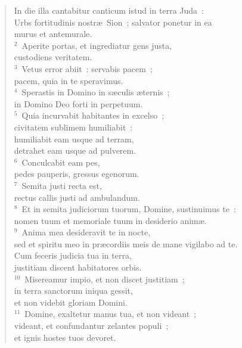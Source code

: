 \begin{flushleft}\begin{verse}\vspace{-19pt}\hspace{6pt}In die illa cantabitur canticum istud in terra Juda~:\\\hspace{6pt} Urbs fortitudinis nostr\ae\ Sion~; salvator ponetur in ea\\ murus et antemurale.\\
${}^{2}$~Aperite portas, et ingrediatur gens justa,\\ custodiens veritatem.\\
${}^{3}$~Vetus error abiit~: servabis pacem~;\\ pacem, quia in te speravimus.\\
${}^{4}$~Sperastis in Domino in s\ae culis \ae ternis~;\\ in Domino Deo forti in perpetuum.\\
${}^{5}$~Quia incurvabit habitantes in excelso~;\\ civitatem sublimem humiliabit~:\\ humiliabit eam usque ad terram,\\ detrahet eam usque ad pulverem.\\
${}^{6}$~Conculcabit eam pes,\\ pedes pauperis, gressus egenorum.\\
${}^{7}$~Semita justi recta est,\\ rectus callis justi ad ambulandum.\\
${}^{8}$~Et in semita judiciorum tuorum, Domine, sustinuimus te~:\\ nomen tuum et memoriale tuum in desiderio anim\ae .\\
${}^{9}$~Anima mea desideravit te in nocte,\\ sed et spiritu meo in pr\ae cordiis meis de mane vigilabo ad te.\\ Cum feceris judicia tua in terra,\\ justitiam discent habitatores orbis.\\
${}^{10}$~Misereamur impio, et non discet justitiam~;\\ in terra sanctorum iniqua gessit,\\ et non videbit gloriam Domini.\\
${}^{11}$~Domine, exaltetur manus tua, et non videant~;\\ videant, et confundantur zelantes populi~;\\ et ignis hostes tuos devoret.\\

\end{verse}
\end{flushleft}
